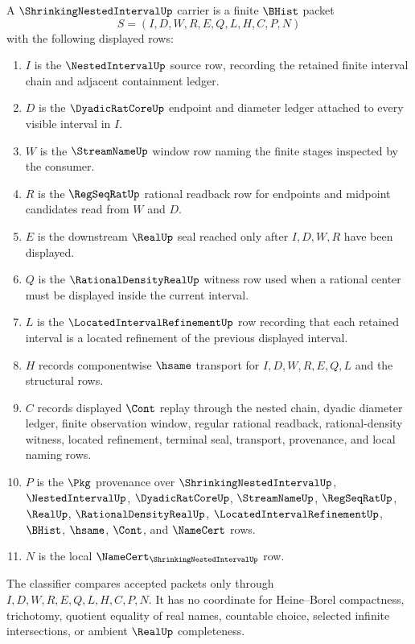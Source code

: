 \begin{definition}\label{def:shrinking-nested-interval-carrier}
A $\ShrinkingNestedIntervalUp$ carrier is a finite $\BHist$ packet
$$
S=(I,D,W,R,E,Q,L,H,C,P,N)
$$
with the following displayed rows:
\begin{enumerate}
\item $I$ is the $\NestedIntervalUp$ source row, recording the retained finite interval chain and adjacent containment ledger.
\item $D$ is the $\DyadicRatCoreUp$ endpoint and diameter ledger attached to every visible interval in $I$.
\item $W$ is the $\StreamNameUp$ window row naming the finite stages inspected by the consumer.
\item $R$ is the $\RegSeqRatUp$ rational readback row for endpoints and midpoint candidates read from $W$ and $D$.
\item $E$ is the downstream $\RealUp$ seal reached only after $I,D,W,R$ have been displayed.
\item $Q$ is the $\RationalDensityRealUp$ witness row used when a rational center must be displayed inside the current interval.
\item $L$ is the $\LocatedIntervalRefinementUp$ row recording that each retained interval is a located refinement of the previous displayed interval.
\item $H$ records componentwise $\hsame$ transport for $I,D,W,R,E,Q,L$ and the structural rows.
\item $C$ records displayed $\Cont$ replay through the nested chain, dyadic diameter ledger, finite observation window, regular rational readback, rational-density witness, located refinement, terminal seal, transport, provenance, and local naming rows.
\item $P$ is the $\Pkg$ provenance over $\ShrinkingNestedIntervalUp$, $\NestedIntervalUp$, $\DyadicRatCoreUp$, $\StreamNameUp$, $\RegSeqRatUp$, $\RealUp$, $\RationalDensityRealUp$, $\LocatedIntervalRefinementUp$, $\BHist$, $\hsame$, $\Cont$, and $\NameCert$ rows.
\item $N$ is the local $\NameCert_{\ShrinkingNestedIntervalUp}$ row.
\end{enumerate}
The classifier compares accepted packets only through $I,D,W,R,E,Q,L,H,C,P,N$. It has no coordinate for Heine--Borel compactness, trichotomy, quotient equality of real names, countable choice, selected infinite intersections, or ambient $\RealUp$ completeness.
\end{definition}


